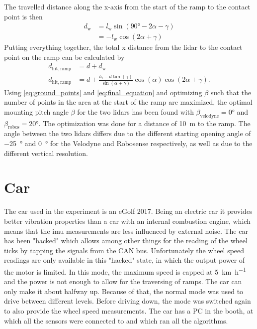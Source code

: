 The travelled distance along the x-axis from the start of the ramp to the contact point is then
\begin{align}
	d_\mathrm{w} & = l_\mathrm{w} \sin(\ang{90} - 2\alpha - \gamma) \nonumber \\
	             & = -l_\mathrm{w} \cos(2\alpha + \gamma)
\end{align}
Putting everything together, the total x distance from the \gls{lidar} to the contact point on the ramp can be calculated by
\begin{align}
	d_\mathrm{hit,ramp} & = d + d_\mathrm{w}                                                                                    \nonumber \\
	d_\mathrm{hit,ramp} & = d + \frac{h_\mathrm{l} - d\tan(\gamma)}{\sin(\alpha + \gamma)} \cos(\alpha) \cos(2\alpha + \gamma).
	\label{eq:final_equation}
\end{align}
Using \cref{eq:ground_points} and \cref{eq:final_equation} and optimizing $\beta$ such that the number of points in the area at the start of the ramp are maximized, the optimal mounting pitch angle $\beta$ for the two \glspl{lidar} has been found with $\beta_\mathrm{velodyne} = \ang{0}$ and $\beta_\mathrm{robos} = \ang{20}$.
The optimization was done for a distance of \SI{10}{\metre} to the ramp.
The angle between the two \glspl{lidar} differs due to the different starting opening angle of \SI{-25}{\degree} and \SI{0}{\degree} for the Velodyne and Robosense respectively, as well as due to the different vertical resolution.


\section{Car}
\label{sec:car}
The car used in the experiment is an eGolf 2017.
Being an electric car it provides better vibration properties than a car with an internal combustion engine, which means that the \gls{imu} measurements are less influenced by external noise.
The car has been "hacked" which allows among other things for the reading of the wheel ticks by tapping the signals from the CAN bus.
Unfortunately the wheel speed readings are only available in this "hacked" state, in which the output power of the motor is limited.
In this mode, the maximum speed is capped at \SI{5}{\kilo\metre\per\hour} and the power is not enough to allow for the traversing of ramps.
The car can only make it about halfway up.
Because of that, the normal mode was used to drive between different levels.
Before driving down, the mode was switched again to also provide the wheel speed measurements.
The car has a PC in the booth, at which all the sensors were connected to and which ran all the algorithms.



